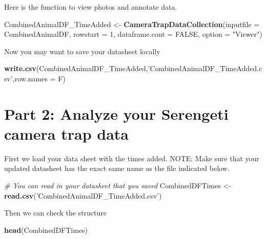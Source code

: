\documentclass[]{book}
\newenvironment{Shaded}{\begin{snugshade}}{\end{snugshade}}
\newcommand{\CommentTok}[1]{\textcolor[rgb]{0.56,0.35,0.01}{\textit{#1}}}
\newcommand{\DataTypeTok}[1]{\textcolor[rgb]{0.13,0.29,0.53}{#1}}
\newcommand{\DecValTok}[1]{\textcolor[rgb]{0.00,0.00,0.81}{#1}}
\newcommand{\KeywordTok}[1]{\textcolor[rgb]{0.13,0.29,0.53}{\textbf{#1}}}
\newcommand{\NormalTok}[1]{#1}
\newcommand{\OtherTok}[1]{\textcolor[rgb]{0.56,0.35,0.01}{#1}}
\newcommand{\StringTok}[1]{\textcolor[rgb]{0.31,0.60,0.02}{#1}}
\begin{document}
Here is the function to view photos and annotate data.

\begin{Shaded}
\begin{Highlighting}[]
\NormalTok{CombinedAnimalDF_TimeAdded <-}\StringTok{ }\KeywordTok{CameraTrapDataCollection}\NormalTok{(}\DataTypeTok{inputfile =}\NormalTok{ CombinedAnimalDF, }
                                                       \DataTypeTok{rowstart =} \DecValTok{1}\NormalTok{, }\DataTypeTok{dataframe.cont =} \OtherTok{FALSE}\NormalTok{, }\DataTypeTok{option =} \StringTok{"Viewer"}\NormalTok{)}
\end{Highlighting}
\end{Shaded}

Now you may want to save your datasheet locally

\begin{Shaded}
\begin{Highlighting}[]
\KeywordTok{write.csv}\NormalTok{(CombinedAnimalDF_TimeAdded,}\StringTok{'CombinedAnimalDF_TimeAdded.csv'}\NormalTok{,}\DataTypeTok{row.names =}\NormalTok{ F)}
\end{Highlighting}
\end{Shaded}

\hypertarget{part-2-analyze-your-serengeti-camera-trap-data}{%
\section{Part 2: Analyze your Serengeti camera trap data}\label{part-2-analyze-your-serengeti-camera-trap-data}}

First we load your data sheet with the times added.
NOTE: Make sure that your updated datasheet has the exact same name as the file indicated below.

\begin{Shaded}
\begin{Highlighting}[]
\CommentTok{# You can read in your datasheet that you saved}
\NormalTok{CombinedDFTimes <-}\StringTok{ }\KeywordTok{read.csv}\NormalTok{(}\StringTok{'CombinedAnimalDF_TimeAdded.csv'}\NormalTok{)}
\end{Highlighting}
\end{Shaded}

Then we can check the structure

\begin{Shaded}
\begin{Highlighting}[]
\KeywordTok{head}\NormalTok{(CombinedDFTimes)}
\end{Highlighting}
\end{Shaded}
\end{document}
